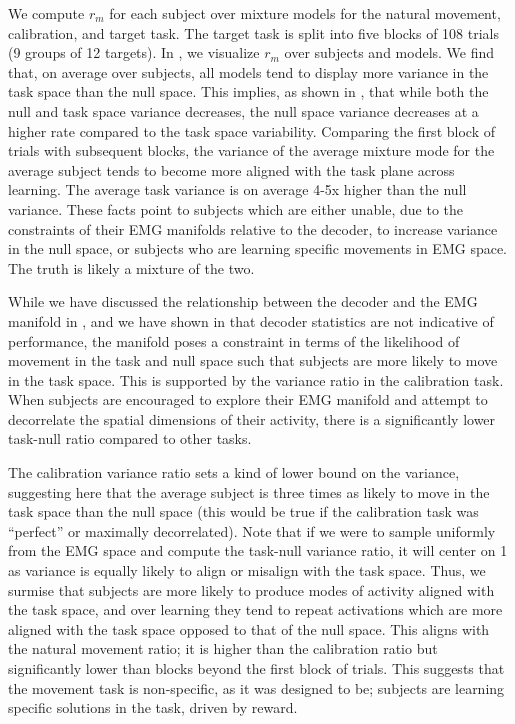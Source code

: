 \documentclass[../main.tex]{subfiles}
\begin{document}
  We compute $r_m$ for each subject over mixture models for the natural movement, calibration, and target task. The target task is split into five blocks of 108 trials (9 groups of 12 targets). In , we visualize $r_m$ over subjects and models. We find that, on average over subjects, all models tend to display more variance in the task space than the null space. This implies, as shown in , that while both the null and task space variance decreases, the null space variance decreases at a higher rate compared to the task space variability. Comparing the first block of trials with subsequent blocks, the variance of the average mixture mode for the average subject tends to become more aligned with the task plane across learning. The average task variance is on average 4-5x higher than the null variance. These facts point to subjects which are either unable, due to the constraints of their EMG manifolds relative to the decoder, to increase variance in the null space, or subjects who are learning specific movements in EMG space. The truth is likely a mixture of the two. 
  
  While we have discussed the relationship between the decoder and the EMG manifold in , and we have shown in  that decoder statistics are not indicative of performance, the manifold poses a constraint in terms of the likelihood of movement in the task and null space such that subjects are more likely to move in the task space. This is supported by the variance ratio in the calibration task. When subjects are encouraged to explore their EMG manifold and attempt to decorrelate the spatial dimensions of their activity, there is a significantly lower task-null ratio compared to other tasks.
  
  The calibration variance ratio sets a kind of lower bound on the variance, suggesting here that the average subject is three times as likely to move in the task space than the null space (this would be true if the calibration task was ``perfect'' or maximally decorrelated). Note that if we were to sample uniformly from the EMG space and compute the task-null variance ratio, it will center on 1 as variance is equally likely to align or misalign with the task space. Thus, we surmise that subjects are more likely to produce modes of activity aligned with the task space, and over learning they tend to repeat activations which are more aligned with the task space opposed to that of the null space. This aligns with the natural movement ratio; it is higher than the calibration ratio but significantly lower than blocks beyond the first block of trials. This suggests that the movement task is non-specific, as it was designed to be; subjects are learning specific solutions in the task, driven by reward.
  
\end{document}
